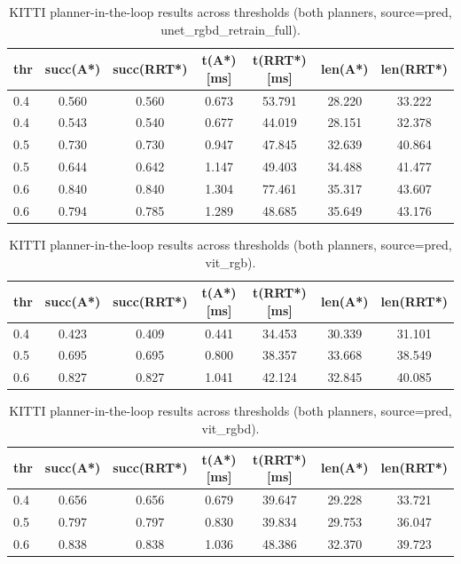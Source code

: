 

\begin{table}[H]
  \centering
  \caption{KITTI planner-in-the-loop results across thresholds (both planners, source=pred, unet_rgbd_retrain_full).}
  \label{tab:kitti_planner_pred_unet_rgbd_retrain_full}
  \begin{tabular}{lcccccc}
    \toprule
    thr & succ(A*) & succ(RRT*) & t(A*) [ms] & t(RRT*) [ms] & len(A*) & len(RRT*) \\ 
    \midrule
    0.4 & 0.560 & 0.560 & 0.673 & 53.791 & 28.220 & 33.222 \\
    0.4 & 0.543 & 0.540 & 0.677 & 44.019 & 28.151 & 32.378 \\
    0.5 & 0.730 & 0.730 & 0.947 & 47.845 & 32.639 & 40.864 \\
    0.5 & 0.644 & 0.642 & 1.147 & 49.403 & 34.488 & 41.477 \\
    0.6 & 0.840 & 0.840 & 1.304 & 77.461 & 35.317 & 43.607 \\
    0.6 & 0.794 & 0.785 & 1.289 & 48.685 & 35.649 & 43.176 \\
    \bottomrule
  \end{tabular}
\end{table}





\begin{table}[H]
  \centering
  \caption{KITTI planner-in-the-loop results across thresholds (both planners, source=pred, vit_rgb).}
  \label{tab:kitti_planner_pred_vit_rgb}
  \begin{tabular}{lcccccc}
    \toprule
    thr & succ(A*) & succ(RRT*) & t(A*) [ms] & t(RRT*) [ms] & len(A*) & len(RRT*) \\ 
    \midrule
    0.4 & 0.423 & 0.409 & 0.441 & 34.453 & 30.339 & 31.101 \\
    0.5 & 0.695 & 0.695 & 0.800 & 38.357 & 33.668 & 38.549 \\
    0.6 & 0.827 & 0.827 & 1.041 & 42.124 & 32.845 & 40.085 \\
    \bottomrule
  \end{tabular}
\end{table}





\begin{table}[H]
  \centering
  \caption{KITTI planner-in-the-loop results across thresholds (both planners, source=pred, vit_rgbd).}
  \label{tab:kitti_planner_pred_vit_rgbd}
  \begin{tabular}{lcccccc}
    \toprule
    thr & succ(A*) & succ(RRT*) & t(A*) [ms] & t(RRT*) [ms] & len(A*) & len(RRT*) \\ 
    \midrule
    0.4 & 0.656 & 0.656 & 0.679 & 39.647 & 29.228 & 33.721 \\
    0.5 & 0.797 & 0.797 & 0.830 & 39.834 & 29.753 & 36.047 \\
    0.6 & 0.838 & 0.838 & 1.036 & 48.386 & 32.370 & 39.723 \\
    \bottomrule
  \end{tabular}
\end{table}
